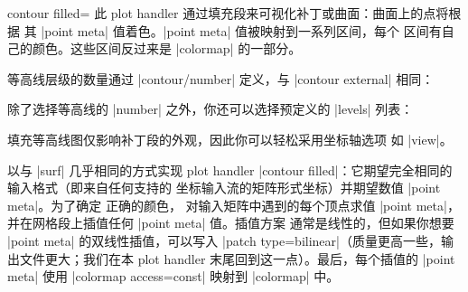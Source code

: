 {{\begin{plottype}[/pgfplots]{
    contour filled=\textcolor{black}{}%
}
    此 plot handler 通过填充段来可视化补丁或曲面：曲面上的点将根据
    其 |point meta| 值着色。|point meta| 值被映射到一系列区间，每个
    区间有自己的颜色。这些区间反过来是 |colormap| 的一部分。
\pgfplotsexpensiveexample
\begin{codeexample}[]
\end{codeexample}
    等高线层级的数量通过 |contour/number| 定义，与 |contour external|
    相同：

\pgfplotsexpensiveexample
\begin{codeexample}[]
\end{codeexample}

    除了选择等高线的 |number| 之外，你还可以选择预定义的 |levels|
    列表：
\pgfplotsexpensiveexample
\begin{codeexample}[]
\end{codeexample}
    填充等高线图仅影响补丁段的外观，因此你可以轻松采用坐标轴选项
    如 |view|。

    \PGFPlots{} 以与 |surf| 几乎相同的方式实现 plot handler
    |contour filled|：它期望完全相同的输入格式（即来自任何支持的
    坐标输入流的矩阵形式坐标）并期望数值 |point meta|。为了确定
    正确的颜色，\PGFPlots{} 对输入矩阵中遇到的每个顶点求值
    |point meta|，并在网格段上插值任何 |point meta| 值。插值方案
    通常是线性的，但如果你想要 |point meta| 的双线性插值，可以写入
    |patch type=bilinear|（质量更高一些，输出文件更大；我们在本
    plot handler 末尾回到这一点）。最后，每个插值的 |point meta|
    使用 |colormap access=const| 映射到 |colormap| 中。


\end{plottype}}}
